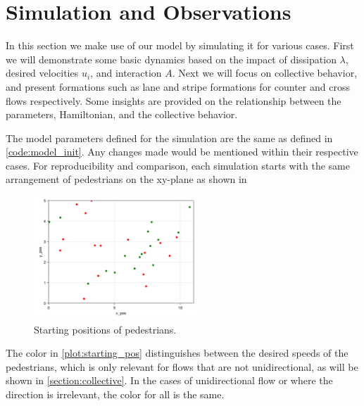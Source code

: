 \section{Simulation and Observations}
In this section we make use of our model by simulating it for various cases. First we will demonstrate some basic dynamics based on the impact of dissipation $\lambda$, desired velocities $u_i$, and interaction $A$. Next we will focus on collective behavior, and present formations such as lane and stripe formations for counter and cross flows respectively. Some insights are provided on the relationship between the parameters, Hamiltonian, and the collective behavior.

The model parameters defined for the simulation are the same as defined in \autoref{code:model_init}. Any changes made would be mentioned within their respective cases. For reproducibility and comparison, each simulation starts with the same arrangement of pedestrians on the xy-plane as shown in 
\begin{figure}[H]
    \centering
    \includegraphics[width=0.55\textwidth]{figures/start_pos.png}
    \caption{Starting positions of pedestrians.}
    \label{plot:starting_pos}
\end{figure}
The color in \autoref{plot:starting_pos} distinguishes between the desired speeds of the pedestrians, which is only relevant for flows that are not unidirectional, as will be shown in \autoref{section:collective}. In the cases of unidirectional flow or where the direction is irrelevant, the color for all is the same.

